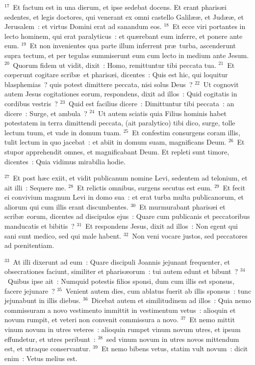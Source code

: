 ${}^{17}$~Et factum est in una dierum, et ipse sedebat docens. Et erant pharis\ae i sedentes, et legis doctores, qui venerant ex omni castello Galil\ae \ae , et Jud\ae \ae , et Jerusalem~: et virtus Domini erat ad sanandum eos.
${}^{18}$~Et ecce viri portantes in lecto hominem, qui erat paralyticus~: et qu\ae rebant eum inferre, et ponere ante eum.
${}^{19}$~Et non invenientes qua parte illum inferrent pr\ae\ turba, ascenderunt supra tectum, et per tegulas summiserunt eum cum lecto in medium ante Jesum.
${}^{20}$~Quorum fidem ut vidit, dixit~: Homo, remittuntur tibi peccata tua.
${}^{21}$~Et cœperunt cogitare scrib\ae\ et pharis\ae i, dicentes~: Quis est hic, qui loquitur blasphemias~? quis potest dimittere peccata, nisi solus Deus~?
${}^{22}$~Ut cognovit autem Jesus cogitationes eorum, respondens, dixit ad illos~: Quid cogitatis in cordibus vestris~?
${}^{23}$~Quid est facilius dicere~: Dimittuntur tibi peccata~: an dicere~: Surge, et ambula~?
${}^{24}$~Ut autem sciatis quia Filius hominis habet potestatem in terra dimittendi peccata, (ait paralytico) tibi dico, surge, tolle lectum tuum, et vade in domum tuam.
${}^{25}$~Et confestim consurgens coram illis, tulit lectum in quo jacebat~: et abiit in domum suam, magnificans Deum.
${}^{26}$~Et stupor apprehendit omnes, et magnificabant Deum. Et repleti sunt timore, dicentes~: Quia vidimus mirabilia hodie.


${}^{27}$~Et post h\ae c exiit, et vidit publicanum nomine Levi, sedentem ad telonium, et ait illi~: Sequere me.
${}^{28}$~Et relictis omnibus, surgens secutus est eum.
${}^{29}$~Et fecit ei convivium magnum Levi in domo sua~: et erat turba multa publicanorum, et aliorum qui cum illis erant discumbentes.
${}^{30}$~Et murmurabant pharis\ae i et scrib\ae\ eorum, dicentes ad discipulos ejus~: Quare cum publicanis et peccatoribus manducatis et bibitis~?
${}^{31}$~Et respondens Jesus, dixit ad illos~: Non egent qui sani sunt medico, sed qui male habent.
${}^{32}$~Non veni vocare justos, sed peccatores ad pœnitentiam.


${}^{33}$~At illi dixerunt ad eum~: Quare discipuli Joannis jejunant frequenter, et obsecrationes faciunt, similiter et pharis\ae orum~: tui autem edunt et bibunt~?
${}^{34}$~Quibus ipse ait~: Numquid potestis filios sponsi, dum cum illis est sponsus, facere jejunare~?
${}^{35}$~Venient autem dies, cum ablatus fuerit ab illis sponsus~: tunc jejunabunt in illis diebus.
${}^{36}$~Dicebat autem et similitudinem ad illos~: Quia nemo commissuram a novo vestimento immittit in vestimentum vetus~: alioquin et novum rumpit, et veteri non convenit commissura a novo.
${}^{37}$~Et nemo mittit vinum novum in utres veteres~: alioquin rumpet vinum novum utres, et ipsum effundetur, et utres peribunt~:
${}^{38}$~sed vinum novum in utres novos mittendum est, et utraque conservantur.
${}^{39}$~Et nemo bibens vetus, statim vult novum~: dicit enim~: Vetus melius est.

